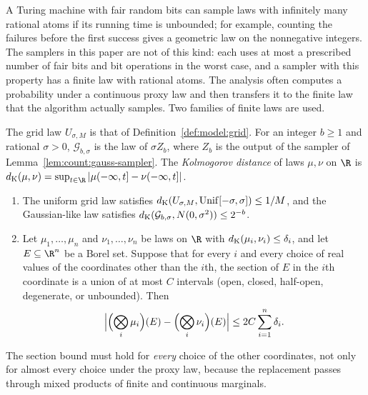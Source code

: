 A Turing machine with fair random bits can sample laws with infinitely many
rational atoms if its running time is unbounded; for example, counting the
failures before the first success gives a geometric law on the nonnegative
integers. The samplers in this paper are not of this kind: each uses at most
a prescribed number of fair bits and bit operations in the worst case, and a
sampler with this property has a finite law with rational atoms. The analysis
often computes a probability under a continuous proxy law and then transfers
it to the finite law that the algorithm actually samples. Two families of
finite laws are used.

\begin{definition}\label{def:count:laws}
The grid law $U_{\sigma,M}$ is that of Definition~\ref{def:model:grid}. For an
integer $b\ge1$ and rational $\sigma>0$,
$\mathcal G_{b,\sigma}$ is the law of $\sigma Z_b$, where $Z_b$ is the
output of the sampler of Lemma~\ref{lem:count:gauss-sampler}. The
\emph{Kolmogorov distance} of laws $\mu,\nu$ on $\R$ is
$d_{\rm K}(\mu,\nu)=\sup_{t\in\R}|\mu(-\infty,t]-\nu(-\infty,t]|$.
\end{definition}

\begin{lemma}\label{lem:count:transfer}
\begin{enumerate}[label=(\alph*)]
\item The uniform grid law satisfies
 $d_{\rm K}(U_{\sigma,M},\mathrm{Unif}[-\sigma,\sigma])\le1/M$, and
 the Gaussian-like law satisfies
 $d_{\rm K}(\mathcal G_{b,\sigma},N(0,\sigma^2))\le2^{-b}$.
\item Let $\mu_1,\dots,\mu_n$ and $\nu_1,\dots,\nu_n$ be laws on $\R$ with
 $d_{\rm K}(\mu_i,\nu_i)\le\delta_i$, and let $E\subseteq\R^n$ be a Borel
 set. Suppose that for every $i$ and every choice of real values of the
 coordinates other than the $i$th, the section of $E$ in the $i$th coordinate
 is a union of at most $C$ intervals (open, closed, half-open, degenerate, or
 unbounded). Then
 \[
  \Bigl|\Bigl(\bigotimes_i\mu_i\Bigr)(E)-\Bigl(\bigotimes_i\nu_i\Bigr)(E)\Bigr|
  \le2C\sum_{i=1}^n\delta_i .
 \]
\end{enumerate}
\end{lemma}

The section bound must hold for \emph{every} choice of the other
coordinates, not only for almost every choice under the proxy law, because
the replacement passes through mixed products of finite and continuous
marginals.


